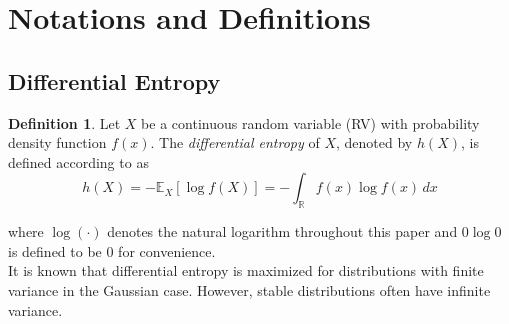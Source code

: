 \documentclass{article}
\theoremstyle{definition}
\newtheorem{definition}{Definition}[section]
\begin{document}
\section{Notations and Definitions}
\subsection{Differential Entropy}
\begin{definition}
Let \( X \) be a continuous random variable (RV) with probability density function \( f(x) \). The {\em differential entropy} of \( X \), denoted by \( h(X) \), is defined according to \cite{alma991008265479709436} as
\begin{equation}\label{definition of differential entropy}
h(X) = -\mathbb{E}_X[\log f(X)]= -\int_{\mathbb{R}} f(x) \log f(x) \, dx    
\end{equation}
\end{definition}
\noindent where \(\log(\cdot)\) denotes the natural logarithm throughout this paper and \(0\log0\) is defined to be 0 for convenience.\\

It is known that differential entropy is maximized for distributions with finite variance in the Gaussian case. However, stable distributions often have infinite variance.


\end{document}
